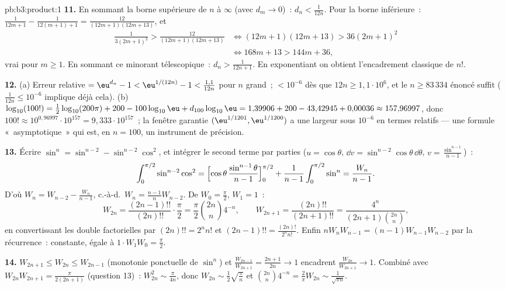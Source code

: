 \begin{solution}{pb:b3:product:1}
\textbf{11.} En sommant la borne supérieure de $n$ à
$\infty$ (avec $d_m \to 0$)~: $d_n < \frac1{12n}$. Pour la
borne inférieure~: $\frac1{12m+1} - \frac1{12(m+1)+1} =
\frac{12}{(12m+1)(12m+13)}$, et
\begin{align*}
\frac1{3(2m+1)^2} > \frac{12}{(12m+1)(12m+13)}
&\iff (12m+1)(12m+13) > 36(2m+1)^2 \\
&\iff 168m + 13 > 144m + 36,
\end{align*}
vrai pour $m \geq 1$. En sommant ce minorant télescopique~:
$d_n > \frac1{12n+1}$. En exponentiant on obtient
l'encadrement classique de $n!$.

\textbf{12.} (a) Erreur relative $= \eu^{d_n} - 1 <
\eu^{1/(12n)} - 1 < \frac{1{,}1}{12n}$ pour $n$ grand~; $<
10^{-6}$ dès que $12n \geq 1{,}1\cdot10^6$, et le $n \geq
83\,334$ énoncé suffit ($\frac1{12n} \leq 10^{-6}$
implique déjà cela). (b) $\log_{10}(100!) =
\frac12\log_{10}(200\pi) + 200 - 100\log_{10}\eu +
d_{100}\log_{10}\eu = 1{,}39906 + 200 - 43{,}42945 +
0{,}00036 \approx 157{,}96997$, donc $100! \approx
10^{0{,}96997} \cdot 10^{157} = 9{,}333\cdot10^{157}$~; la
fenêtre garantie $(\eu^{1/1201}, \eu^{1/1200})$ a une largeur
sous $10^{-6}$ en termes relatifs --- une formule
«~asymptotique~» qui est, en $n = 100$, un instrument de
précision.

\textbf{13.} Écrire $\sin^n = \sin^{n-2} -
\sin^{n-2}\cos^2$, et intégrer le second terme par parties
($u = \cos\theta$, $\dd v = \sin^{n-2}\cos\theta\,\dd\theta$,
$v = \frac{\sin^{n-1}}{n-1}$)~:
\[
\int_0^{\pi/2}\sin^{n-2}\cos^2 =
\Bigl[\cos\theta\,\frac{\sin^{n-1}\theta}{n-1}\Bigr]_0^{\pi/2}
+ \frac1{n-1}\int_0^{\pi/2}\sin^n = \frac{W_n}{n-1} .
\]
D'où $W_n = W_{n-2} - \frac{W_n}{n-1}$, c.-à-d.\ $W_n =
\frac{n-1}nW_{n-2}$. De $W_0 = \frac\pi2$, $W_1 = 1$~:
\[
W_{2n} = \frac{(2n-1)!!}{(2n)!!}\cdot\frac\pi2
= \frac\pi2\binom{2n}n4^{-n},
\qquad
W_{2n+1} = \frac{(2n)!!}{(2n+1)!!}
= \frac{4^n}{(2n+1)\binom{2n}n},
\]
en convertissant les double factorielles par $(2n)!! =
2^nn!$ et $(2n-1)!! = \frac{(2n)!}{2^nn!}$. Enfin
$nW_nW_{n-1} = (n-1)W_{n-1}W_{n-2}$ par la récurrence~:
constante, égale à $1\cdot W_1W_0 = \frac\pi2$.

\textbf{14.} $W_{2n+1} \leq W_{2n} \leq W_{2n-1}$
(monotonie ponctuelle de $\sin^n$) et
$\frac{W_{2n-1}}{W_{2n+1}} = \frac{2n+1}{2n} \to 1$
encadrent $\frac{W_{2n}}{W_{2n+1}} \to 1$. Combiné avec
$W_{2n}W_{2n+1} = \frac{\pi}{2(2n+1)}$ (question 13)~:
$W_{2n}^2 \sim \frac\pi{4n}$, donc $W_{2n} \sim
\frac12\sqrt{\frac\pi n}$ et $\binom{2n}n4^{-n} =
\frac2\pi W_{2n} \sim \frac1{\sqrt{\pi n}}$.


\end{solution}
